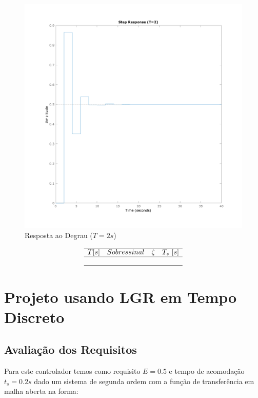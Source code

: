 \documentclass[a4paper,11pt]{article}
\begin{document}
\begin{figure}[H]
    \centering
    \includegraphics[width=0.8\linewidth]{img/exsim3-step-t2000ms.png}
    \caption{ Resposta ao Degrau ($T=2s$)}
\end{figure}


\begin{table}[H]
    $$
    \begin{array}{cccc}
        \hline
        T [s] & Sobressinal & \zeta & T_s\ [s] \\
        \hline
        
        \\\hline
    \end{array}
    $$
\end{table}


\subsection{}

\section{Projeto usando LGR em Tempo Discreto}

\subsection{Avaliação dos Requisitos}

Para este controlador temos como requisito $E=0.5$ e tempo de acomodação $t_s = 0.2s$ dado um sistema de segunda ordem com a função de transferência em malha aberta na forma:
\end{document}
